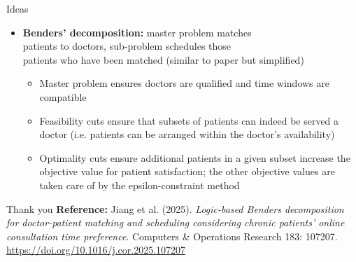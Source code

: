 \documentclass{beamer}
\begin{document}
\begin{frame}{Ideas}
    \begin{itemize}
        \item \textbf{Benders' decomposition:} master problem matches \\patients to doctors, sub-problem schedules those \\ patients who have been matched (similar to paper but simplified)
        \begin{itemize}
            \item Master problem ensures doctors are qualified and time windows are compatible
            \item Feasibility cuts ensure that subsets of patients can indeed be served a doctor (i.e. patients can be arranged within the doctor's availability)
            \item Optimality cuts ensure additional patients in a given subset increase the objective value for patient satisfaction; the other objective values are taken care of by the epsilon-constraint method
        \end{itemize}
    \end{itemize}
    \vspace{-2em}
    \centering
\end{frame}

\begin{frame}{Thank you}
  \textbf{Reference:} Jiang et al. (2025). \textit{Logic-based Benders decomposition for doctor-patient matching and scheduling considering chronic patients’ online consultation time preference}. Computers \& Operations Research 183: 107207. 
  \url{https://doi.org/10.1016/j.cor.2025.107207}
\end{frame}
\end{document}
